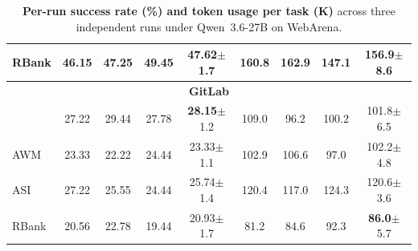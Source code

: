 \begin{table}[ht]
\begin{tabular}{lcccccccc}
RBank          & 46.15 & 47.25 & 49.45 & 47.62{\scriptsize $\pm$1.7} & 160.8 & 162.9 & 147.1 & 156.9{\scriptsize $\pm$8.6} \\
\midrule
\multicolumn{9}{c}{\textbf{GitLab}} \\
\midrule
\budgetactor{}      & 27.22 & 29.44 & 27.78 & \textbf{28.15}{\scriptsize $\pm$1.2} & 109.0 & 96.2 & 100.2 & 101.8{\scriptsize $\pm$6.5} \\
AWM            & 23.33 & 22.22 & 24.44 & 23.33{\scriptsize $\pm$1.1} & 102.9 & 106.6 & 97.0 & 102.2{\scriptsize $\pm$4.8} \\
ASI            & 27.22 & 25.55 & 24.44 & 25.74{\scriptsize $\pm$1.4} & 120.4 & 117.0 & 124.3 & 120.6{\scriptsize $\pm$3.6} \\
RBank          & 20.56 & 22.78 & 19.44 & 20.93{\scriptsize $\pm$1.7} & 81.2 & 84.6 & 92.3 & \textbf{86.0}{\scriptsize $\pm$5.7} \\
\bottomrule
\end{tabular}
\caption{\textbf{Per-run success rate (\%) and token usage per task (K)} across three independent runs under Qwen~3.6-27B on WebArena.}
\label{tab:variance-qwen}
\end{table}
